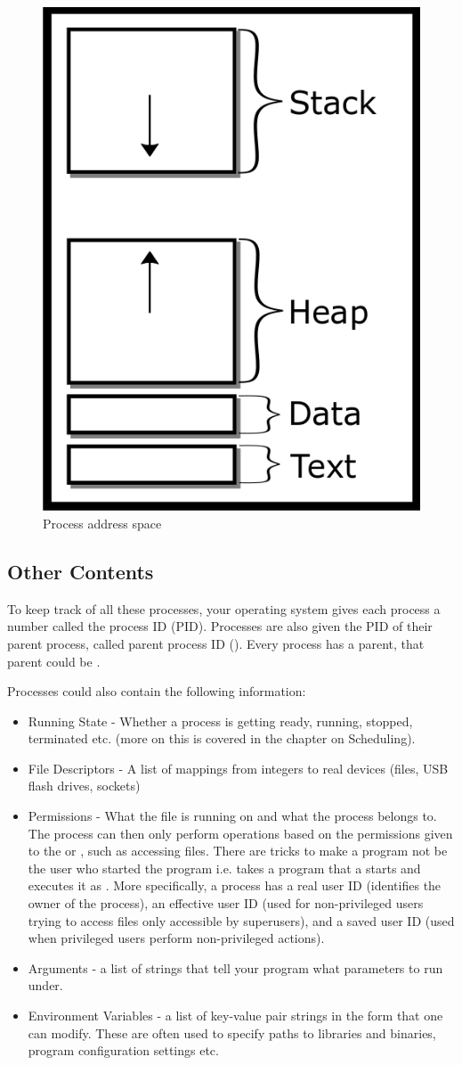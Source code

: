 \begin{figure}[H]
\centering
\includegraphics[width=.3\textwidth]{processes/drawings/address_space.png}
\caption{Process address space}
\end{figure}



\subsection{Other Contents}

To keep track of all these processes, your operating system gives each process a number called the process ID (PID).
Processes are also given the PID of their parent process, called parent process ID ().
Every process has a parent, that parent could be .

Processes could also contain the following information:

\begin{itemize}
    \item Running State - Whether a process is getting ready, running, stopped, terminated etc. (more on this is covered in the chapter on Scheduling).
    \item File Descriptors - A list of mappings from integers to real devices (files, USB flash drives, sockets)
    \item Permissions - What  the file is running on and what  the process belongs to.
          The process can then only perform operations based on the permissions given to the  or , such as accessing files.
          There are tricks to make a program not be the user who started the program i.e.  takes a program that a  starts and executes it as .
          More specifically, a process has a real user ID (identifies the owner of the process), an effective user ID (used for non-privileged users trying to access files only accessible by superusers), and a saved user ID (used when privileged users perform non-privileged actions).
    \item Arguments - a list of strings that tell your program what parameters to run under.
    \item Environment Variables - a list of key-value pair strings in the form  that one can modify. These are often used to specify paths to libraries and binaries, program configuration settings etc.
\end{itemize}

